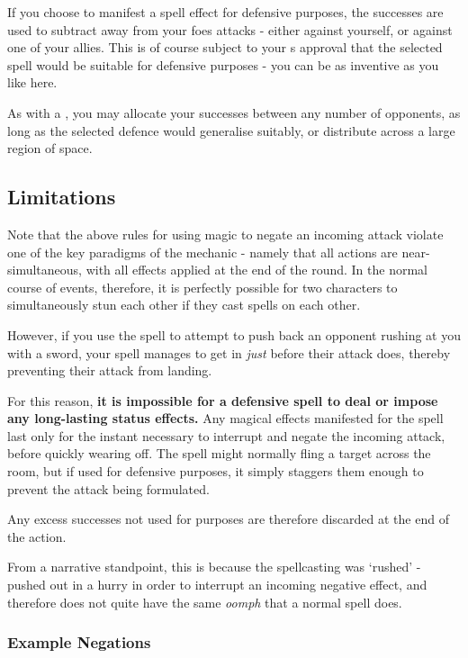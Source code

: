 If you choose to manifest a spell effect for defensive purposes, the successes are used to subtract away from your foes attacks - either against yourself, or against one of your allies. This is of course subject to your s approval that the selected spell would be suitable for defensive purposes - you can be as inventive as you like here. 

As with a , you may allocate your successes between any number of opponents, as long as the selected defence would generalise suitably, or distribute across a large region of space.

\subsection{Limitations}

Note that the above rules for using magic to negate an incoming attack violate one of the key paradigms of the  mechanic - namely that all actions are near-simultaneous, with all effects applied at the end of the round. In the normal course of events, therefore, it is perfectly possible for two characters to simultaneously stun each other if they cast spells on each other. 

However, if you use the  spell to attempt to push back an opponent rushing at you with a sword, your spell manages to get in {\it just} before their attack does, thereby preventing their attack from landing. 

For this reason, {\bf it is impossible for a defensive spell to deal  or impose any long-lasting status effects.} Any magical effects manifested for the spell last only for the instant necessary to interrupt and negate the incoming attack, before quickly wearing off. The  spell might normally fling a target across the room, but if used for defensive purposes, it simply staggers them enough to prevent the attack being formulated. 


Any excess successes not used for  purposes are therefore discarded at the end of the action.

From a narrative standpoint, this is because the spellcasting was `rushed' - pushed out in a hurry in order to interrupt an incoming negative effect, and therefore does not quite have the same {\it oomph} that a normal spell does. 

\subsubsection{Example Negations}

